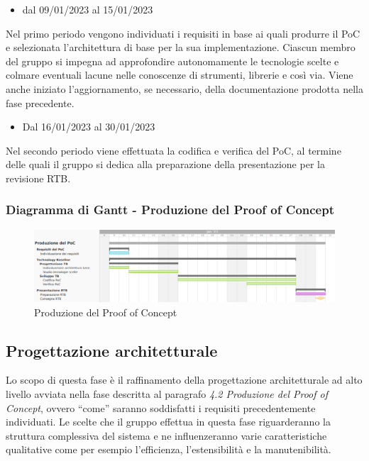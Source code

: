 \begin{itemize}
    \item dal 09/01/2023 al 15/01/2023
\end{itemize}
Nel primo periodo vengono individuati i requisiti in base ai quali produrre il PoC e selezionata l’architettura di base per la sua implementazione. Ciascun membro del gruppo si impegna ad approfondire autonomamente le tecnologie scelte e colmare eventuali lacune nelle conoscenze di strumenti, librerie e così via. Viene anche iniziato l'aggiornamento, se necessario, della documentazione prodotta nella fase precedente.

\begin{itemize}
    \item Dal 16/01/2023 al 30/01/2023
\end{itemize}
Nel secondo periodo viene effettuata la codifica e verifica del PoC, al termine delle quali il gruppo si dedica alla preparazione della presentazione per la revisione RTB.

\subsubsection{Diagramma di Gantt - Produzione del Proof of Concept}

\begin{figure}[H]
\centering
\includegraphics[width=\textwidth]{img/4_produzione.png}
\caption{Produzione del Proof of Concept}
\end{figure}

\subsection{Progettazione architetturale}
Lo scopo di questa fase è il raffinamento della progettazione architetturale ad alto livello avviata nella fase descritta al paragrafo \textit{4.2 Produzione del Proof of Concept}, ovvero “come” saranno soddisfatti i requisiti precedentemente individuati.
Le scelte che il gruppo effettua in questa fase riguarderanno la struttura complessiva del sistema e ne influenzeranno varie caratteristiche qualitative come per esempio l’efficienza, l’estensibilità e la manutenibilità.

